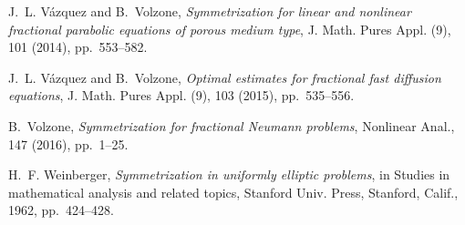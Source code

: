 \documentclass[a4paper,10pt,reqno]{amsart}
\numberwithin{equation}{section}
\begin{document}
\begin{thebibliography}{10}
{\sc J.~L. V{\'a}zquez and B.~Volzone}, {\em Symmetrization for linear and
  nonlinear fractional parabolic equations of porous medium type}, J. Math.
  Pures Appl. (9), 101 (2014), pp.~553--582.

{\sc J.~L. V{\'a}zquez and B.~Volzone}, {\em Optimal estimates
  for fractional fast diffusion equations}, J. Math. Pures Appl. (9), 103
  (2015), pp.~535--556.

{\sc B.~Volzone}, {\em Symmetrization for fractional Neumann problems},
Nonlinear Anal., 147 (2016), pp.~1--25.

{\sc H.~F. Weinberger}, {\em Symmetrization in uniformly elliptic problems}, in
  Studies in mathematical analysis and related topics, Stanford Univ. Press,
  Stanford, Calif., 1962, pp.~424--428.

\end{thebibliography}

\end{document}
